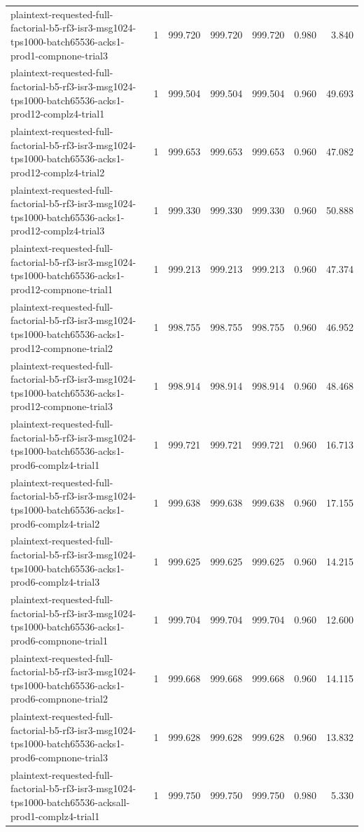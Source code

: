 \begin{tabular}{lrrrrrr}
plaintext-requested-full-factorial-b5-rf3-isr3-msg1024-tps1000-batch65536-acks1-prod1-compnone-trial3 & 1 & 999.720 & 999.720 & 999.720 & 0.980 & 3.840 \\
plaintext-requested-full-factorial-b5-rf3-isr3-msg1024-tps1000-batch65536-acks1-prod12-complz4-trial1 & 1 & 999.504 & 999.504 & 999.504 & 0.960 & 49.693 \\
plaintext-requested-full-factorial-b5-rf3-isr3-msg1024-tps1000-batch65536-acks1-prod12-complz4-trial2 & 1 & 999.653 & 999.653 & 999.653 & 0.960 & 47.082 \\
plaintext-requested-full-factorial-b5-rf3-isr3-msg1024-tps1000-batch65536-acks1-prod12-complz4-trial3 & 1 & 999.330 & 999.330 & 999.330 & 0.960 & 50.888 \\
plaintext-requested-full-factorial-b5-rf3-isr3-msg1024-tps1000-batch65536-acks1-prod12-compnone-trial1 & 1 & 999.213 & 999.213 & 999.213 & 0.960 & 47.374 \\
plaintext-requested-full-factorial-b5-rf3-isr3-msg1024-tps1000-batch65536-acks1-prod12-compnone-trial2 & 1 & 998.755 & 998.755 & 998.755 & 0.960 & 46.952 \\
plaintext-requested-full-factorial-b5-rf3-isr3-msg1024-tps1000-batch65536-acks1-prod12-compnone-trial3 & 1 & 998.914 & 998.914 & 998.914 & 0.960 & 48.468 \\
plaintext-requested-full-factorial-b5-rf3-isr3-msg1024-tps1000-batch65536-acks1-prod6-complz4-trial1 & 1 & 999.721 & 999.721 & 999.721 & 0.960 & 16.713 \\
plaintext-requested-full-factorial-b5-rf3-isr3-msg1024-tps1000-batch65536-acks1-prod6-complz4-trial2 & 1 & 999.638 & 999.638 & 999.638 & 0.960 & 17.155 \\
plaintext-requested-full-factorial-b5-rf3-isr3-msg1024-tps1000-batch65536-acks1-prod6-complz4-trial3 & 1 & 999.625 & 999.625 & 999.625 & 0.960 & 14.215 \\
plaintext-requested-full-factorial-b5-rf3-isr3-msg1024-tps1000-batch65536-acks1-prod6-compnone-trial1 & 1 & 999.704 & 999.704 & 999.704 & 0.960 & 12.600 \\
plaintext-requested-full-factorial-b5-rf3-isr3-msg1024-tps1000-batch65536-acks1-prod6-compnone-trial2 & 1 & 999.668 & 999.668 & 999.668 & 0.960 & 14.115 \\
plaintext-requested-full-factorial-b5-rf3-isr3-msg1024-tps1000-batch65536-acks1-prod6-compnone-trial3 & 1 & 999.628 & 999.628 & 999.628 & 0.960 & 13.832 \\
plaintext-requested-full-factorial-b5-rf3-isr3-msg1024-tps1000-batch65536-acksall-prod1-complz4-trial1 & 1 & 999.750 & 999.750 & 999.750 & 0.980 & 5.330 \\

\end{tabular}
